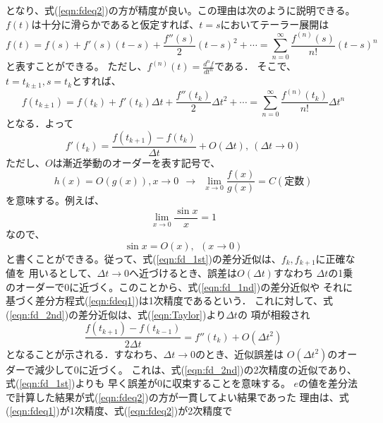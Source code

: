 \documentclass[10pt,a4j,dvipdfmx]{jarticle}
\begin{document}
となり、式(\ref{eqn:fdeq2})の方が精度が良い。この理由は次のように説明できる。
$f(t)$は十分に滑らかであると仮定すれば、$t=s$においてテーラー展開は
\begin{equation}
	f(t)=f(s)+f'(s)(t-s)+\frac{f''(s)}{2}(t-s)^2+\cdots =\sum_{n=0}^\infty \frac{f^{(n)}(s)}{n!}(t-s)^n
	\label{eqn:Taylor}
\end{equation}
と表すことができる。
ただし、$f^{(n)}(t)=\frac{d^nf}{dt^n}$である．
そこで、$t=t_{k\pm 1}, s=t_k$とすれば、
\begin{equation}
	f(t_{k\pm 1})=f(t_k)+f'(t_k)\Delta t+\frac{f''(t_k)}{2}\Delta t ^2+\cdots 
	=\sum_{n=0}^\infty \frac{f^{(n)}(t_k)}{n!}\Delta t^n
	\label{eqn:Taylor}
\end{equation}
となる．よって
\begin{equation}
	f'(t_k)
	=
	\frac{ f(t_{k+1})-f(t_k) }{\Delta t}
	+O(\Delta t), \  (\Delta t \rightarrow 0) 
	\label{eqn:}
\end{equation}
ただし、$O$は漸近挙動のオーダーを表す記号で、
\begin{equation}
	h(x)=O(g(x)), x\rightarrow 0  \ \   \rightarrow \ \ \lim_{x\rightarrow 0} \frac{f(x)}{g(x)}=C(定数)
	\label{eqn:}
\end{equation}
を意味する。例えば、
\begin{equation}
	\lim_{x\rightarrow 0} \frac{\sin x}{x}=1
	\label{eqn:}
\end{equation}
なので、
\begin{equation}
	\sin x = O(x), \ \ (x\rightarrow 0)
	\label{eqn:}
\end{equation}
と書くことができる。従って、式(\ref{eqn:fd_1st})の差分近似は、$f_k, f_{k+1}$に正確な値を
用いるとして、$\Delta t \rightarrow 0$へ近づけるとき、誤差は$O(\Delta t)$すなわち
$\Delta t$の1乗のオーダーで0に近づく。このことから、式(\ref{eqn:fd_1nd})の差分近似や
それに基づく差分方程式(\ref{eqn:fdeq1})は1次精度であるという．
これに対して、式(\ref{eqn:fd_2nd})の差分近似は、式(\ref{eqn:Taylor})より$\Delta t$の
項が相殺され
\begin{equation}
	\frac{f(t_{k+1})-f(t_{k-1})}{2\Delta t}=f''(t_k) + O(\Delta t^2)
	\label{eqn:}
\end{equation}
となることが示される．すなわち、$\Delta t \rightarrow 0$のとき、近似誤差は
$O(\Delta t^2)$のオーダーで減少して0に近づく。
これは、式(\ref{eqn:fd_2nd})の2次精度の近似であり、式(\ref{eqn:fd_1st})よりも
早く誤差が0に収束することを意味する。
$e$の値を差分法で計算した結果が式(\ref{eqn:fdeq2})の方が一貫してよい結果であった
理由は、式(\ref{eqn:fdeq1})が1次精度、式(\ref{eqn:fdeq2})が2次精度で
\end{document}
